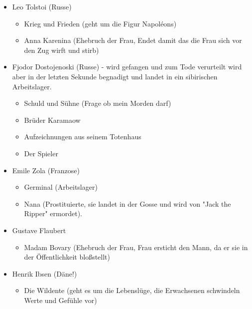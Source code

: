\documentclass[12pt,a4paper]{article}
\begin{document}
\begin{itemize}
\item Leo Tolstoi (Russe)

	\begin{itemize}
	\item Krieg und Frieden (geht um die Figur Napoléons)
	\item Anna Karenina (Ehebruch der Frau, Endet damit das die Frau sich vor den Zug wirft und stirb)
	\end{itemize}
	
\item Fjodor Dostojenoski (Russe) - wird gefangen und zum Tode verurteilt wird aber in der letzten Sekunde begnadigt und landet in ein sibirischen Arbeitslager.

	\begin{itemize}
	\item Schuld und Sühne (Frage ob mein Morden darf)
	\item Brüder Karamaow 
	\item Aufzeichnungen aus seinem Totenhaus
	\item Der Spieler
	\end{itemize}
	
\item Emile Zola (Franzose)
	
	\begin{itemize}
	\item Germinal (Arbeitslager)
	\item Nana (Prostituierte, sie landet in der Gosse und wird von "Jack the Ripper" ermordet).
	\end{itemize}
	
\item Gustave Flaubert

	\begin{itemize}
	\item Madam Bovary (Ehebruch der Frau, Frau ersticht den Mann, da er sie in der Öffentlichkeit bloßstellt)
	\end{itemize}
	
\item Henrik Ibsen (Däne!)

	\begin{itemize}
	\item Die Wildente (geht es um die Lebenslüge, die Erwachsenen schwindeln Werte und Gefühle vor)
	\end{itemize}		
	
\end{itemize}
\end{document}
